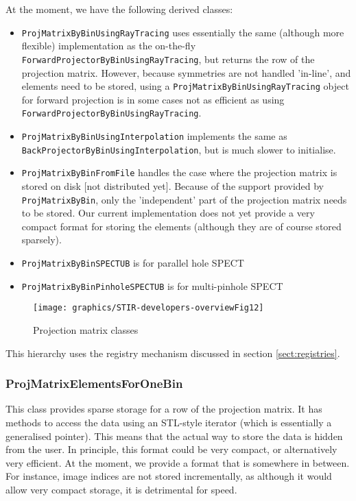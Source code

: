 \documentclass{article}
\begin{document}
At the moment, we have the following derived classes:
\begin{itemize}
\item 
\texttt{ProjMatrixByBinUsingRayTracing} uses essentially the same 
(although more flexible) implementation as the on-the-fly \texttt{ForwardProjectorByBinUsingRayTracing}, but 
returns the row of the projection matrix. However, because symmetries 
are not handled 'in-line', and elements need to be stored, using 
a \texttt{ProjMatrixByBinUsingRayTracing} object for forward projection 
is in some cases not as efficient as using \texttt{ForwardProjectorByBinUsingRayTracing}.
\item
\texttt{ProjMatrixByBinUsingInterpolation} implements the same as
\texttt{BackProjectorByBinUsingInterpolation}, but is much slower to initialise.
\item 
\texttt{ProjMatrixByBinFromFile} handles the case where the projection 
matrix is stored on disk [not distributed yet]. Because of the 
support provided by \texttt{ProjMatrixByBin}, only the 'independent' 
part of the projection matrix needs to be stored. Our current 
implementation does not yet provide a very compact format for 
storing the elements (although they are of course stored sparsely).
\item
\texttt{ProjMatrixByBinSPECTUB} is for parallel hole SPECT
\item
\texttt{ProjMatrixByBinPinholeSPECTUB} is for multi-pinhole SPECT
\end{itemize}

\begin{figure}[htbp]
\begin{center}
\texttt{[image: graphics/STIR-developers-overviewFig12]}
\caption{Projection matrix classes}
\end{center}
\end{figure}

This hierarchy uses the registry mechanism discussed in section 
\ref{sect:registries}.


\subsubsection{
ProjMatrixElementsForOneBin }

This class provides sparse storage for a row of the projection 
matrix. It has methods to access the data using an STL-style 
iterator (which is essentially a generalised pointer). This means 
that the actual way to store the data is hidden from the user. 
In principle, this format could be very compact, or alternatively 
very efficient. At the moment, we provide a format that is somewhere 
in between. For instance, image indices are not stored incrementally, 
as although it would allow very compact storage, it is detrimental 
for speed.
\end{document}

